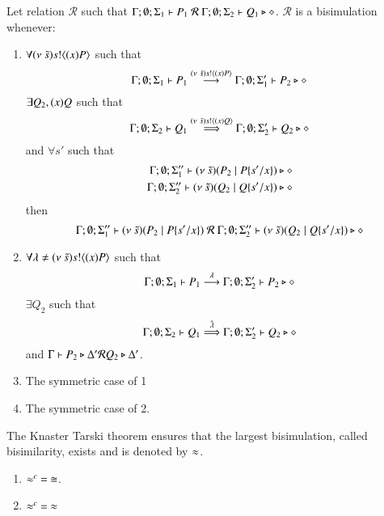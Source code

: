 \begin{definition}[Bisimulation]\rm
	Let relation $\mathcal{R}$ such that $\Gamma; \emptyset; \Sigma_1 \vdash P_1\ \mathcal{R}\ \Gamma; \emptyset; \Sigma_2 \vdash Q_1 \triangleright \diamond$.
	$\mathcal{R}$ is a bisimulation whenever:
	\begin{enumerate}
		\item	$\forall (\nu\ \tilde{s}) s ! \langle (x)P \rangle$ such that
			\[
				\Gamma; \emptyset; \Sigma_1 \vdash P_1 \stackrel{(\nu\ \tilde{s}) s ! \langle (x)P \rangle}{\longrightarrow} \Gamma; \emptyset; \Sigma_1' \vdash P_2 \triangleright \diamond
			\]
			$\exists Q_2, (x)Q$ such that
			\[
				\Gamma; \emptyset; \Sigma_2 \vdash Q_1 \stackrel{(\nu\ \tilde{s}) s ! \langle (x)Q \rangle}{\Longrightarrow} \Gamma; \emptyset; \Sigma_2' \vdash Q_2 \triangleright \diamond
			\]
			and $\forall s'$
			such that
			\begin{eqnarray*}
				\Gamma; \emptyset; \Sigma_1'' \vdash (\nu\ \tilde{s})(P_2 \;|\; P \{s'/x \}) \triangleright \diamond \\
				\Gamma; \emptyset; \Sigma_2'' \vdash (\nu\ \tilde{s})(Q_2 \;|\; Q \{s'/x \}) \triangleright \diamond
			\end{eqnarray*}
			then
			\[
				\Gamma; \emptyset; \Sigma_1'' \proves \newsp{\tilde{s}}{P_2 \Par P \subst{s'}{x}}\ \mathcal{R}\ 
				\Gamma; \emptyset; \Sigma_2'' \proves \newsp{\tilde{s}}{Q_2 \Par Q \subst{s'}{x}} \hastype \Proc
			\]

		\item	$\forall \lambda \not= (\nu\ \tilde{s}) s ! \langle (x)P \rangle$ such that
			\[
				\Gamma; \emptyset; \Sigma_1 \vdash P_1 \stackrel{\lambda}{\longrightarrow} \Gamma; \emptyset; \Sigma_2' \vdash P_2 \triangleright \diamond
			\]
			$\exists Q_2$ such that 
			\[
				\Gamma; \emptyset; \Sigma_2 \vdash Q_1 \stackrel{\hat{\lambda}}{\Longrightarrow} \Gamma; \emptyset; \Sigma_2' \vdash Q_2 \triangleright \diamond
			\]
			and
			$\Gamma \vdash P_2 \triangleright \Delta' \mathcal{R} Q_2 \triangleright \Delta'$.

		\item	The symmetric case of 1 
		\item	The symmetric case of 2.
	\end{enumerate}
	The Knaster Tarski theorem ensures that the largest bisimulation, called bisimilarity, exists and is denoted by $\approx$.
\end{definition}

\begin{theorem}
	\begin{enumerate}
		\item	$\approx^{c}\ =\ \cong$.
		\item	$\approx^{c}\ =\ \approx$
	\end{enumerate}
\end{theorem}

